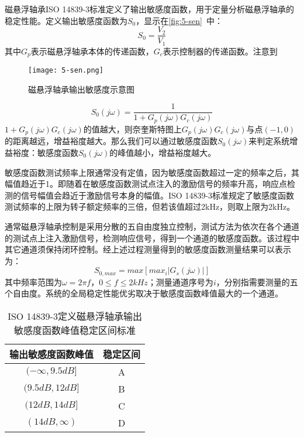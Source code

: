 \documentclass[
  lang=cn,
  degree=master,
  openany,oneside
]{nuaathesis}
\begin{document}
磁悬浮轴承ISO 14839-3标准\cite{iso2004mechanical}定义了输出敏感度函数，用于定量分析磁悬浮轴承的稳定性能。定义输出敏感度函数为$S_0$，显示在\autoref{fig:5-sen}~中：
\begin{equation}
	S_0 = \frac{V_2}{V_1}
\end{equation}
其中$G_p$表示磁悬浮轴承本体的传递函数，$G_c$表示控制器的传递函数。注意到
\begin{figure}[h!]
	\texttt{[image: 5-sen.png]}
	\caption{磁悬浮轴承输出敏感度示意图}
	\label{fig:5-sen}
\end{figure}

\begin{equation}
	S_0(j\omega) = \frac{1}{1 + G_p(j\omega)G_c(j\omega)}
\end{equation}
$1 + G_p(j\omega)G_c(j\omega)$的值越大，则奈奎斯特图上$G_p(j\omega)G_c(j\omega)$与点$(-1,0)$的距离越远，增益裕度越大。那么我们可以通过敏感度函数$S_0(j\omega)$来判定系统增益裕度：敏感度函数$S_0(j\omega)$的峰值越小，增益裕度越大。

敏感度函数测试频率上限通常没有定值，因为敏感度函数超过一定的频率之后，其幅值趋近于1。即随着在敏感度函数测试点注入的激励信号的频率升高，响应点检测的信号幅值会趋近于激励信号本身的幅值。ISO 14839-3标准规定了敏感度函数测试频率的上限为转子额定频率的三倍，但若该值超过2kHz，则取上限为2kHz。

通常磁悬浮轴承控制是采用分散的五自由度独立控制，测试方法为依次在各个通道的测试点上注入激励信号，检测响应信号，得到一个通道的敏感度函数。该过程中其它通道须保持闭环控制。经上述过程测量得到的敏感度函数测量结果可以表示为：
\begin{equation}
	S_{0,max} = max \left[ max_i \left|G_s(j\omega)\right| \right]
\end{equation}
其中频率范围为$\omega = 2 \pi f$，$0 \leq f \leq 2kHz$；测量通道序号为$i$，分别指需要测量的五个自由度。系统的全局稳定性能优劣取决于敏感度函数峰值最大的一个通道。

\begin{table}[h!]
  \caption[ISO 14839-3定义磁悬浮轴承输出敏感度函数峰值稳定区间标准]{ISO 14839-3定义磁悬浮轴承输出敏感度函数峰值稳定区间标准\label{tab:amb_iso}}
  \begin{tabular}{cc}
    \toprule
    输出敏感度函数峰值 & 稳定区间 \\
    \midrule
    $(-\infty,9.5dB]$ & A\\
    $(9.5dB,12dB]$    & B\\
    $(12dB,14dB]$     & C\\
    $(14dB,\infty)$   & D\\
    \bottomrule
  \end{tabular}
\end{table}
\end{document}
